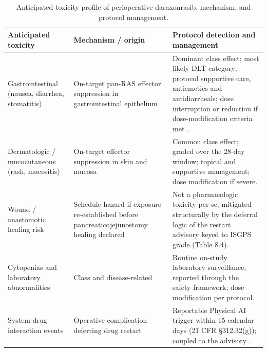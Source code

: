 \begin{table}[t]
\centering
\caption{Anticipated toxicity profile of perioperative daraxonrasib, mechanism,
and protocol management.}
\label{tab:sec07-toxprofile}
\begin{tabularx}{\textwidth}{L{3.2cm} L{3.6cm} Y}
\toprule
\textbf{Anticipated toxicity} & \textbf{Mechanism / origin} & \textbf{Protocol detection and management} \\
\midrule
Gastrointestinal (nausea, diarrhea, stomatitis) & On-target pan-RAS effector suppression in gastrointestinal epithelium & Dominant class effect; most likely DLT category; protocol supportive care, antiemetics and antidiarrheals; dose interruption or reduction if dose-modification criteria met \cite{onpremwhippl}. \\
Dermatologic / mucocutaneous (rash, mucositis) & On-target effector suppression in skin and mucosa & Common class effect; graded over the 28-day window; topical and supportive management; dose modification if severe. \\
Wound / anastomotic healing risk & Schedule hazard if exposure re-established before pancreaticojejunostomy healing declared & Not a pharmacologic toxicity per se; mitigated structurally by the deferral logic of the restart advisory keyed to ISGPS grade (Table 8.4). \\
Cytopenias and laboratory abnormalities & Class and disease-related & Routine on-study laboratory surveillance; reported through the safety framework; dose modification per protocol. \\
System-drug interaction events & Operative complication deferring drug restart & Reportable Physical AI trigger within 15 calendar days (21 CFR \S 312.32(g)); coupled to the advisory \cite{cfr312paiuni}. \\
\bottomrule
\end{tabularx}
\end{table}


